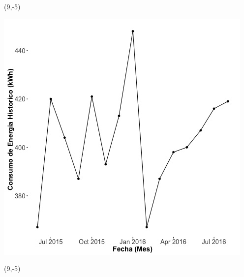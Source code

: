 \documentclass{article}\usepackage[]{graphicx}\usepackage[]{color}
\newenvironment{knitrout}{}{} %
\begin{document}
 \begin{textblock}{1}(9,-5)
\begin{minipage}{20em}
\begingroup

\endgroup
\end{minipage}
\end{textblock}

\begin{knitrout}
\color{fgcolor}
\includegraphics[scale=0.65]{figure/A24_historico_energia} 
\end{knitrout}

 \begin{textblock}{1}(9,-5)
\begin{minipage}{20em}
\begingroup

\endgroup
\end{minipage}
\end{textblock}
\end{document}
